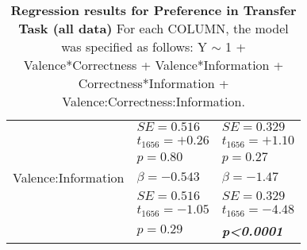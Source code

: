 \begin{table}
\begin{tabular}{r|ll}
&$SE=0.516$&$SE=0.329$\\
&$t_{1656}=+0.26$&$t_{1656}=+1.10$\\
&$p=0.80$&$p=0.27$\\
\hline Valence:Information&$\beta=-0.543$&$\beta=-1.47$\\
&$SE=0.516$&$SE=0.329$\\
&$t_{1656}=-1.05$&$t_{1656}=-4.48$\\
&$p=0.29$&\textbf{\textit{p\textless0.0001}}\\
\hline \hline
\end{tabular}
\caption{\textbf{Regression results for Preference in Transfer Task (all data)} For each COLUMN, the model was specified as follows: Y $\sim$ 1 + Valence*Correctness + Valence*Information + Correctness*Information + Valence:Correctness:Information.}
\label{tab:regTTPreference_allexp}
\end{table}
% 
% 

